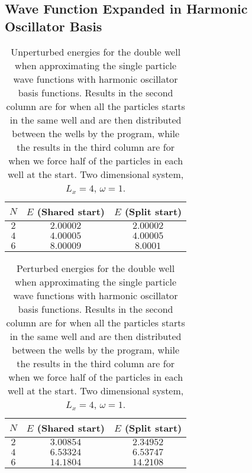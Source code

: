 \documentclass[../main.tex]{subfiles}
\begin{document}
\chapter{}
\section{Wave Function Expanded in Harmonic Oscillator Basis}
\begin{table}[!ht]
  \centering
  \begin{tabular}{ | c | c | c | }
    \hline
    $N$ & $E$ (\textrm{Shared start}) & $E$ (\textrm{Split start}) \\*
    \hline
    $2$ & $2.00002$ & $2.00002$ \\*
    \hline
    $4$ & $4.00005$ & $4.00005$ \\*
    \hline
    $6$ & $8.00009$ & $8.0001$ \\*
    \hline
  \end{tabular}
  \caption{Unperturbed energies for the double well when approximating the single particle wave functions with harmonic oscillator basis functions. Results in the second column are for when all the particles starts in the same well and are then distributed between the wells by the program, while the results in the third column are for when we force half of the particles in each well at the start. Two dimensional system, $L_x=4$, $\omega=1$.}
  \label{tab: unperturbedEnergiesCoeff}
\end{table}

\begin{table}[!ht]
  \centering
  \begin{tabular}{ | c | c | c | }
    \hline
    $N$ & $E$ (\textrm{Shared start}) & $E$ (\textrm{Split start}) \\*
    \hline
    $2$ & $3.00854$ & $2.34952$ \\*
    \hline
    $4$ & $6.53324$ & $6.53747$ \\*
    \hline
    $6$ & $14.1804$ & $14.2108$ \\*
    \hline
  \end{tabular}
  \caption{Perturbed energies for the double well when approximating the single particle wave functions with harmonic oscillator basis functions. Results in the second column are for when all the particles starts in the same well and are then distributed between the wells by the program, while the results in the third column are for when we force half of the particles in each well at the start. Two dimensional system, $L_x=4$, $\omega=1$.}
  \label{tab: perturbedEnergiesCoeff}
\end{table}
\end{document}
